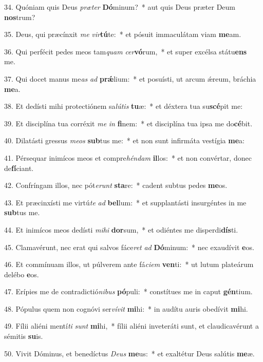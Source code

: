 34. Quóniam quis Deus \textit{præ}\textit{ter} \textbf{Dó}minum?~*  aut quis Deus præter Deum \textbf{nos}trum?\

35. Deus, qui præcínxit \textit{me} \textit{vir}\textbf{tú}te:~*  et pósuit immaculátam viam \textbf{me}am.\

36. Qui perfécit pedes meos tam\textit{quam} \textit{cer}\textbf{vó}rum,~*  et super excélsa státu\textbf{ens} me.\

37. Qui docet manus me\textit{as} \textit{ad} \textbf{prǽ}lium:~*  et posuísti, ut arcum ǽreum, bráchia \textbf{me}a.\

38. Et dedísti mihi protectiónem sa\textit{lú}\textit{tis} \textbf{tu}æ:~*  et déxtera tua su\textbf{scé}pit me:\

39. Et disciplína tua corréxit \textit{me} \textit{in} \textbf{fi}nem:~*  et disciplína tua ipsa me do\textbf{cé}bit.\

40. Dilatásti gressus \textit{me}\textit{os} \textbf{sub}tus me:~*  et non sunt infirmáta vestígia \textbf{me}a:\

41. Pérsequar inimícos meos et compre\textit{hén}\textit{dam} \textbf{il}los:~*  et non convértar, donec de\textbf{fí}ciant.\

42. Confríngam illos, nec pót\textit{e}\textit{runt} \textbf{sta}re:~*  cadent subtus pedes \textbf{me}os.\

43. Et præcinxísti me virtú\textit{te} \textit{ad} \textbf{bel}lum:~*  et supplantásti insurgéntes in me \textbf{sub}tus me.\

44. Et inimícos meos dedísti \textit{mi}\textit{hi} \textbf{dor}sum,~*  et odiéntes me disperdi\textbf{dís}ti.\

45. Clamavérunt, nec erat qui salvos fáce\textit{ret} \textit{ad} \textbf{Dó}minum:~*  nec exaudívit \textbf{e}os.\

46. Et commínuam illos, ut púlverem ante fá\textit{ci}\textit{em} \textbf{ven}ti:~*  ut lutum plateárum delébo \textbf{e}os.\

47. Erípies me de contradictió\textit{ni}\textit{bus} \textbf{pó}puli:~*  constítues me in caput \textbf{gén}tium.\

48. Pópulus quem non cognóvi ser\textit{ví}\textit{vit} \textbf{mi}hi:~*  in audítu auris obedívit \textbf{mi}hi.\

49. Fílii aliéni mentí\textit{ti} \textit{sunt} \textbf{mi}hi,~*  fílii aliéni inveteráti sunt, et claudicavérunt a sémitis \textbf{su}is.\

50. Vivit Dóminus, et benedíctus \textit{De}\textit{us} \textbf{me}us:~*  et exaltétur Deus salútis \textbf{me}æ.\


